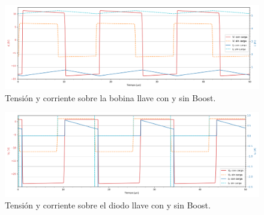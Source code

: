 \begin{multicols}{2}
\begin{figure}[H]
	\centering
	\includegraphics[width=\linewidth]{ImagenesEjercicio-3/il-vl-1v3}
	\caption{Tensión y corriente sobre la bobina llave con y sin Boost.}
	\label{fig:ej3:Il_Vl_SWITCH_BOOST}
\end{figure}

\begin{figure}[H]
	\centering
	\includegraphics[width=\linewidth]{ImagenesEjercicio-3/id-vd-1v3}
	\caption{Tensión y corriente sobre el diodo llave con y sin Boost.}
	\label{fig:ej3:Id_Vd_SWITCH_BOOST}
\end{figure}

\end{multicols}

